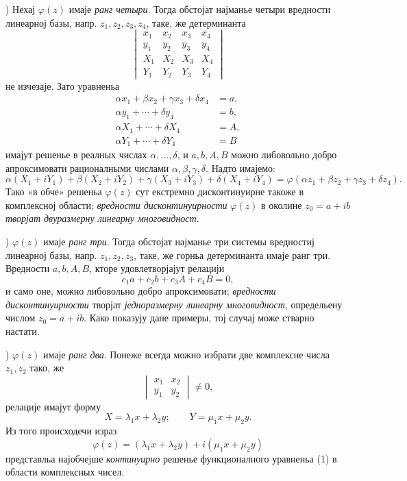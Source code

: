﻿\documentclass[11pt]{article}
\begin{document}
) Нехај \(\varphi(z)\) имаје {\itshape ранг четыри}. Тогда обстојат најманье четыри вредности линеарној базы, напр. \(z_1,z_2,z_3,z_4\), таке, же детерминанта
\[
\begin{vmatrix}
x_1&x_2&x_3&x_4\\
y_1&y_2&y_3&y_4\\
X_1&X_2&X_3&X_4\\
Y_1&Y_2&Y_3&Y_4
\end{vmatrix}
\]
не изчезаје. Зато уравненьа
\[
\begin{aligned}
\alpha x_1+\beta x_2+\gamma x_3+\delta x_4&=a,\\
\alpha y_1+\cdots+\delta y_4&=b,\\
\alpha X_1+\cdots+\delta X_4&=A,\\
\alpha Y_1+\cdots+\delta Y_4&=B
\end{aligned}
\]
имајут решенье в реалных числах \(\alpha,\ldots,\delta\), и \(a,b,A,B\) можно либовольно добро апроксимовати рационалными числами \(\alpha,\beta,\gamma,\delta\). Надто имајемо:
\[
\alpha(X_1+iY_1)+\beta(X_2+iY_2)+\gamma(X_3+iY_3)+\delta(X_4+iY_4)
 =\varphi(\alpha z_1+\beta z_2+\gamma z_3+\delta z_4).
\]
Тако «в обче» решеньа \(\varphi(z)\) сут екстремно дисконтинуирне такоже в комплексној области; {\itshape вредности дисконтинуирности} \(\varphi(z)\) в околине \(z_0=a+ib\) {\itshape творјат двуразмерну линеарну многовидност}.

) \(\varphi(z)\) имаје {\itshape ранг три}. Тогда обстојат најманье три системы вредностиј линеарној базы, напр. \(z_1,z_2,z_3\), таке, же горньа детерминанта имаје ранг три. Вредности \(a,b,A,B\), кторе удовлетворјајут релацији
\[
c_1a+c_2b+c_3A+c_4B=0,
\]
и само оне, можно либовольно добро апроксимовати; {\itshape вредности дисконтинуирности} творјат {\itshape једноразмерну линеарну многовидност}, определьену числом \(z_0=a+ib\). Како показују дане примеры, тој случај може стварно настати.

) \(\varphi(z)\) имаје {\itshape ранг два}. Понеже всегда можно избрати две комплексне числа \(z_1,z_2\) тако, же
\[
\begin{vmatrix}x_1&x_2\\ y_1&y_2\end{vmatrix}\ne0,
\]
релације имајут форму
\[
X=\lambda_1x+\lambda_2y;\qquad Y=\mu_1x+\mu_2y.
\]
Из того происходечи израз
\[
\varphi(z)=(\lambda_1x+\lambda_2y)+i(\mu_1x+\mu_2y)
\]
представльа најобчејше {\itshape континуирно} решенье функционалного уравненьа (1) в области комплексных чисел.
\end{document}
